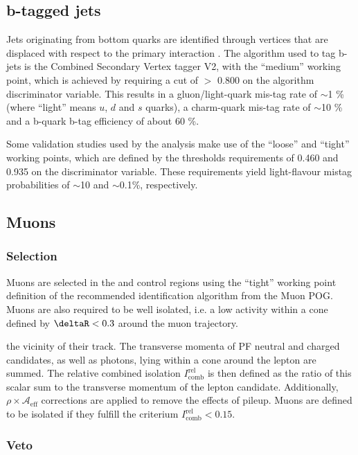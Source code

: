 \subsection{b-tagged jets}
\label{sec:btags}

Jets originating from bottom quarks are identified through vertices
that are displaced with respect to the primary interaction
\cite{Chatrchyan:2012jua}.  The algorithm used to tag b-jets is the
Combined Secondary Vertex tagger V2, with the ``medium'' working
point, which is achieved by requiring a cut of $>$ 0.800 on the
algorithm discriminator variable.  This results in a gluon/light-quark
mis-tag rate of $\sim$1 \% (where ``light'' means $u$, $d$ and $s$
quarks), a charm-quark mis-tag rate of $\sim$10 \% and a b-quark b-tag
efficiency of about 60 \%.

Some validation studies used by the analysis make use of the ``loose''
and ``tight'' working points, which are defined by the thresholds
requirements of 0.460 and 0.935 on the discriminator variable. These
requirements yield light-flavour mistag probabilities of $\sim$10 and
$\sim$0.1\%, respectively.

\subsection{Muons}
\label{sec:muon-id}

\subsubsection{Selection}

Muons are selected in the \mj and \mmj control regions using the
``tight'' working point definition of the recommended identification
algorithm from the Muon POG.  Muons are also required to be well
isolated, i.e. a low activity within a cone defined by $\deltaR < 0.3$
around the muon trajectory.

the vicinity of their track.
The transverse momenta of PF neutral and charged candidates, as well
as photons, lying within a cone around the lepton are summed.  The
relative combined isolation $I^\mathrm{rel}_\mathrm{comb}$ is then defined as the
ratio of this scalar sum to the transverse momentum of the lepton
candidate. Additionally, $\rho\times \mathcal{A}_\textrm{eff}$ corrections are applied
to remove the effects of pileup.  Muons are defined to be isolated if
they fulfill the criterium $I^\mathrm{rel}_\mathrm{comb} < 0.15$.

\subsubsection{Veto}

